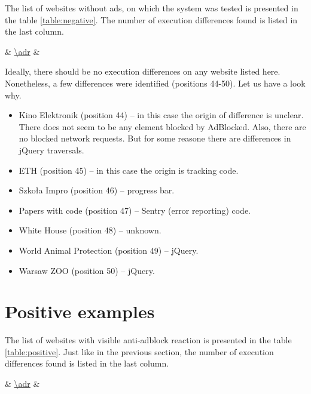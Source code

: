 The list of websites without ads, on which the system was tested is presented in the table \ref{table:negative}.
The number of execution differences found is listed in the last column.

%
{\thecsvrow & \url{\adr} & \cnt}%

Ideally, there should be no execution differences on any website listed here. Nonetheless, a few differences were identified (positions 44-50).
Let us have a look why.


\begin{itemize}
  \item Kino Elektronik (position 44) -- in this case the origin of difference is unclear. There does not seem to be any element
           blocked by AdBlocked. Also, there are no blocked network requests. But for some reasone there are differences in
           jQuery traversals.
  \item ETH (position 45) -- in this case the origin is tracking code.
  \item Szkoła Impro (position 46) -- progress bar.
  \item Papers with code (position 47) -- Sentry (error reporting) code.
  \item White House (position 48) -- unknown.
  \item World Animal Protection (position 49) -- jQuery.
  \item Warsaw ZOO (position 50) -- jQuery.
\end{itemize}

\section{Positive examples}

The list of websites with visible anti-adblock reaction is presented in the table \ref{table:positive}.
Just like in the previous section, the number of execution differences found is listed in the last column.

%
{\thecsvrow & \url{\adr} & \cnt}%

